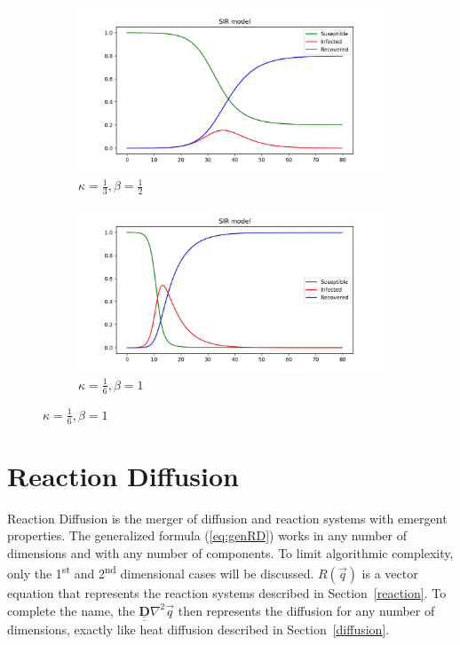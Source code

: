 \documentclass[12pt, letterpaper]{article}
\begin{document}
\begin{figure}[!h]
  \caption{Examples of SIR model}
  \label{fig:SIR}
  \begin{center}
    \begin{subfigure}[b]{.35\linewidth}
      \includegraphics[width=\linewidth]{SIR/SIR_Start}
      \caption{$\kappa = \frac{1}{3}, \beta = \frac{1}{2}$}
    \end{subfigure}
    \begin{subfigure}[b]{.35\linewidth}
      \includegraphics[width=\linewidth]{SIR/SIR_Epi}
      \caption{$\kappa = \frac{1}{6}, \beta =  1$}
    \end{subfigure}
  \end{center}
\end{figure}

\section{Reaction Diffusion} \label{reactiondiffusion}

Reaction Diffusion is the merger of diffusion and reaction systems with emergent properties. The
generalized formula (\ref{eq:genRD}) works in any number of dimensions and with any number of components. To
limit algorithmic complexity, only the 1\textsuperscript{st} and 2\textsuperscript{nd} dimensional cases will be discussed. $R(\vec{q})$ is a vector
equation that represents the reaction systems described in Section~\ref{reaction}. To complete the name, the 
$\underline{\underline{\mathbf{D}}} \nabla^2 \vec{q}$ then represents the diffusion for any number of
dimensions, exactly like heat diffusion described in Section~\ref{diffusion}.
\end{document}
